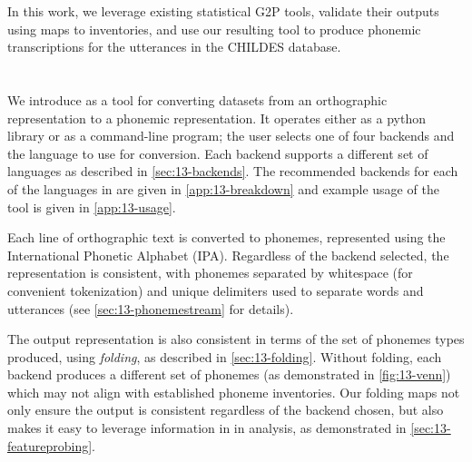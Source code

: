 In this work, we leverage existing statistical G2P tools, validate their outputs using maps to \phoible inventories, and use our resulting tool to produce phonemic transcriptions for the utterances in the CHILDES database.


\section{\gpp}

We introduce \gpp as a tool for converting datasets from an orthographic representation to a phonemic representation. It operates either as a python library or as a command-line program; the user selects one of four backends and the language to use for conversion. Each backend supports a different set of languages as described in \cref{sec:13-backends}. The recommended backends for each of the languages in \ipachildes are given in \cref{app:13-breakdown} and example usage of the tool is given in \cref{app:13-usage}.

Each line of orthographic text is converted to phonemes, represented using the International Phonetic Alphabet (IPA). Regardless of the backend selected, the representation is consistent, with phonemes separated by whitespace (for convenient tokenization) and unique delimiters used to separate words and utterances (see \cref{sec:13-phonemestream} for details). 

The output representation is also consistent in terms of the set of phonemes types produced, using \emph{folding}, as described in \cref{sec:13-folding}. Without folding, each backend produces a different set of phonemes (as demonstrated in \cref{fig:13-venn}) which may not align with established phoneme inventories. Our folding maps not only ensure the output is consistent regardless of the backend chosen, but also makes it easy to leverage information in \phoible in analysis, as demonstrated in \cref{sec:13-featureprobing}.




